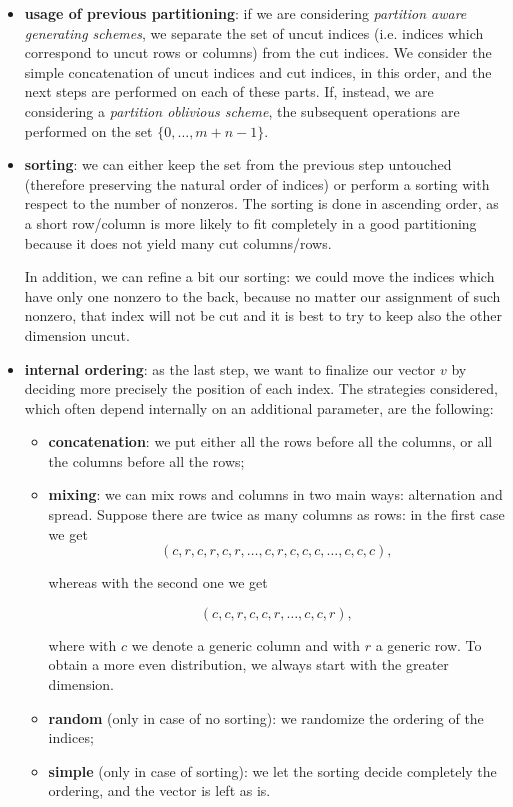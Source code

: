 \begin{itemize}
	\item \textbf{usage of previous partitioning}: if we are considering \emph{partition aware generating schemes}, we separate the set of uncut indices (i.e. indices which correspond to uncut rows or columns) from the  cut indices. We consider the simple concatenation of uncut indices and cut indices, in this order, and the next steps are performed on each of these parts. If, instead, we are considering a \emph{partition oblivious scheme}, the subsequent operations are performed on the set $\{0,\dots,m+n-1\}$.

	\item \textbf{sorting}: we can either keep the set from the previous step untouched (therefore preserving the natural order of indices) or perform a sorting with respect to the number of nonzeros. The sorting is done in ascending order, as a short row/column is more likely to fit completely in a good partitioning because it does not yield many cut columns/rows.

		In addition, we can refine a bit our sorting: we could move the indices which have only one nonzero to the back, because no matter our assignment of such nonzero, that index will not be cut and it is best to try to keep also the other dimension uncut. 

	\item \textbf{internal ordering}: as the last step, we want to finalize our vector $v$ by deciding more precisely the position of each index. The strategies considered, which often depend internally on an additional parameter, are the following:

		\begin{itemize}
			\item \textbf{concatenation}: we put either all the rows before all the columns, or all the columns before all the rows;
			\item \textbf{mixing}: we can mix rows and columns in two main ways: alternation and spread. Suppose there are twice as many columns as rows: in the first case we get
				$$(c,r,c,r,c,r,\dots,c,r,c,c,c,\dots,c,c,c),$$

				whereas with the second one we get 

				$$(c,c,r,c,c,r,\dots,c,c,r),$$

				where with $c$ we denote a generic column and with $r$ a generic row. To obtain a more even distribution, we always start with the greater dimension.
			\item \textbf{random} (only in case of no sorting): we randomize the ordering of the indices;
			\item \textbf{simple} (only in case of sorting): we let the sorting decide completely the ordering, and the vector is left as is.
		\end{itemize}
\end{itemize}

